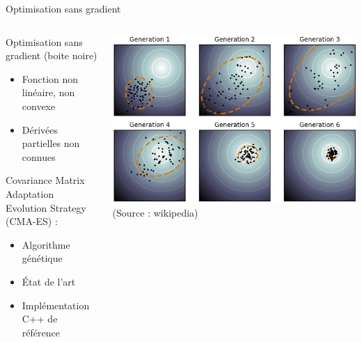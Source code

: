 \begin{frame}{Optimisation sans gradient}
    \begin{columns}
        \begin{column}{0.5\linewidth}
            \begin{block}{Optimisation sans gradient}
                (boite noire)
                \begin{itemize}
                    \item Fonction non linéaire, non convexe
                    \item Dérivées partielles non connues
                \end{itemize}
            \end{block}
            \vspace{1.0em}
            Covariance Matrix Adaptation Evolution Strategy (CMA-ES) :
            \begin{itemize}
                \item Algorithme génétique
                \item État de l'art 
                \item Implémentation C++ de référence
            \end{itemize}
        \end{column}
        \begin{column}{0.5\linewidth}
            \includegraphics[width=1.0\linewidth]{../media/cmaes.png}\\
            \scriptsize
            (Source : wikipedia)
        \end{column}
    \end{columns}
\end{frame}

